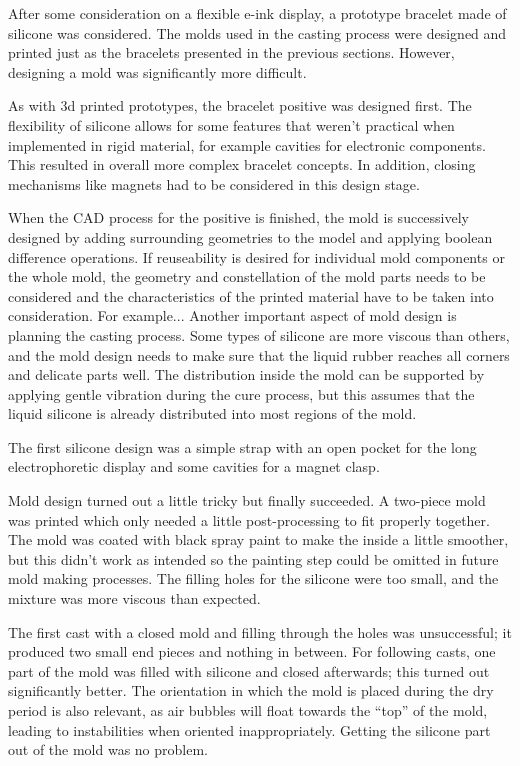 After some consideration on a flexible e-ink display, a prototype bracelet made of silicone was considered. The molds used in the casting process were designed and printed just as the bracelets presented in the previous sections. However, designing a mold was significantly more difficult.

As with 3d printed prototypes, the bracelet positive was designed first. The flexibility of silicone allows for some features that weren't practical when implemented in rigid material, for example cavities for electronic components. This resulted in overall more complex bracelet concepts. In addition, closing mechanisms like magnets had to be considered in this design stage.

When the \ac{CAD} process for the positive is finished, the mold is successively designed by adding surrounding geometries to the model and applying boolean difference operations. If reuseability is desired for individual mold components or the whole mold, the geometry and constellation of the mold parts needs to be considered and the characteristics of the printed material have to be taken into consideration. For example... %
Another important aspect of mold design is planning the casting process. Some types of silicone are more viscous than others, and the mold design needs to make sure that the liquid rubber reaches all corners and delicate parts well. The distribution inside the mold can be supported by applying gentle vibration during the cure process, but this assumes that the liquid silicone is already distributed into most regions of the mold.

The first silicone design was a simple strap with an open pocket for the long electrophoretic display and some cavities for a magnet clasp.

Mold design turned out a little tricky but finally succeeded. A two-piece mold was printed which only needed a little post-processing to fit properly together. The mold was coated with black spray paint to make the inside a little smoother, but this didn't work as intended so the painting step could be omitted in future mold making processes. The filling holes for the silicone were too small, and the mixture was more viscous than expected.

The first cast with a closed mold and filling through the holes was unsuccessful; it produced two small end pieces and nothing in between. For following casts, one part of the mold was filled with silicone and closed afterwards; this turned out significantly better. The orientation in which the mold is placed during the dry period is also relevant, as air bubbles will float towards the ``top'' of the mold, leading to instabilities when oriented inappropriately. Getting the silicone part out of the mold was no problem.

